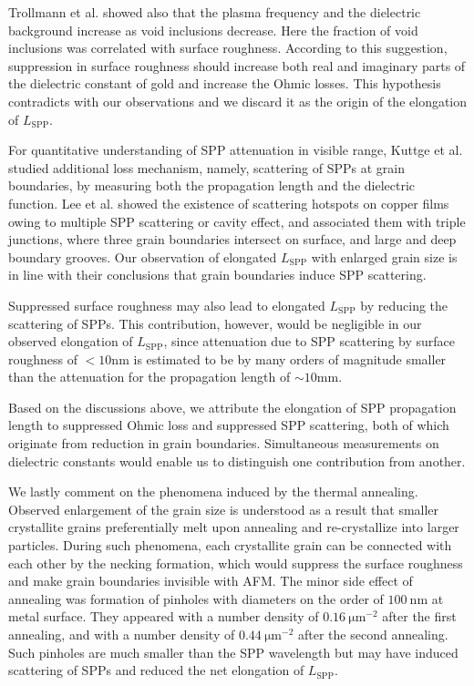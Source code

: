 \documentclass[aip,apl,reprint]{revtex4-1}
\begin{document}
Trollmann et al.\cite{Trollmann} showed also that the plasma frequency and the dielectric background increase as void inclusions decrease. Here the fraction of void inclusions was correlated with surface roughness. According to this suggestion, suppression in surface roughness should increase both real and imaginary parts of the dielectric constant of gold and increase the Ohmic losses. This hypothesis contradicts with our observations and we discard it as the origin of the elongation of $L_{\mathrm{SPP}}$. 

For quantitative understanding of SPP attenuation in visible range, Kuttge et al.\cite{Kuttge} studied additional loss mechanism, namely, scattering of SPPs at grain boundaries, by measuring both the propagation length and the dielectric function. 
Lee et al.\cite{Lee} showed the existence of scattering hotspots on copper films owing to multiple SPP scattering or cavity effect, and associated them with triple junctions, where three grain boundaries intersect on surface, and large and deep boundary grooves. Our observation of elongated $L_{\mathrm{SPP}}$ with enlarged grain size is in line with their conclusions that grain boundaries induce SPP scattering.
 
Suppressed surface roughness may also lead to elongated $L_{\mathrm{SPP}}$ by reducing the scattering of SPPs. This contribution, however, would be negligible in our observed elongation of $L_{\mathrm{SPP}}$, since attenuation due to SPP scattering by surface roughness of $<10 \mathrm{nm}$ is estimated to be by many orders of magnitude smaller than the attenuation for the propagation length of $\sim10 \mathrm{mm}$\cite{Shiba, Kuttge, Mills}.

Based on the discussions above, we attribute the elongation of SPP propagation length to suppressed Ohmic loss and suppressed SPP scattering, both of which originate from reduction in grain boundaries. Simultaneous measurements on dielectric constants would enable us to distinguish one contribution from another.

We lastly comment on the phenomena induced by the thermal annealing.
Observed enlargement of the grain size is understood as a result that smaller crystallite grains preferentially melt upon annealing\cite{Buffat} and re-crystallize into larger particles. 
During such phenomena, each crystallite grain can be connected with each other by the necking formation, which would suppress the surface roughness and make grain boundaries invisible with AFM. The minor side effect of annealing was formation of pinholes with diameters on the order of $100\:\mathrm{nm}$ at metal surface. They appeared with a number density of $0.16\:\mathrm{\mu m}^{-2}$ after the first annealing, and with a number density of $0.44\:\mathrm{\mu m}^{-2}$ after the second annealing. Such pinholes are much smaller than the SPP wavelength but may have induced scattering of SPPs and reduced the net elongation of $L_{\mathrm{SPP}}$.
	
\end{document}
